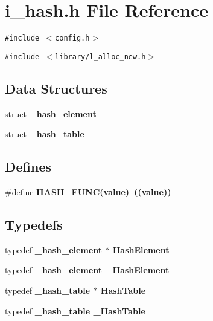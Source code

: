 \section{i\_\-hash.h File Reference}
\label{i__hash_8h}
{\tt \#include $<$config.h$>$}\par
{\tt \#include $<$library/l\_\-alloc\_\-new.h$>$}\par
\subsection*{Data Structures}
\begin{CompactItemize}
\item 
struct \bf{\_\-hash\_\-element}
\item 
struct \bf{\_\-hash\_\-table}
\end{CompactItemize}
\subsection*{Defines}
\begin{CompactItemize}
\item 
\#define \bf{HASH\_\-FUNC}(value)~((value))
\end{CompactItemize}
\subsection*{Typedefs}
\begin{CompactItemize}
\item 
typedef \bf{\_\-hash\_\-element} $\ast$ \bf{Hash\-Element}
\item 
typedef \bf{\_\-hash\_\-element} \bf{\_\-Hash\-Element}
\item 
typedef \bf{\_\-hash\_\-table} $\ast$ \bf{Hash\-Table}
\item 
typedef \bf{\_\-hash\_\-table} \bf{\_\-Hash\-Table}
\end{CompactItemize}
